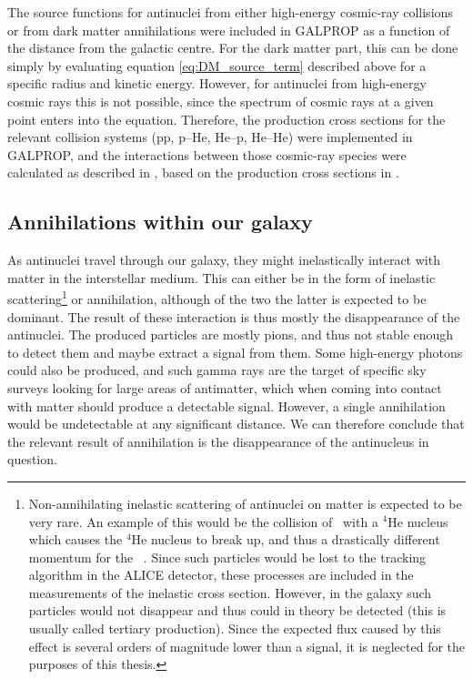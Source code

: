 The source functions for antinuclei from either high-energy cosmic-ray collisions or from dark matter annihilations were included in GALPROP as a function of the distance from the galactic centre. For the dark matter part, this can be done simply by evaluating equation \ref{eq:DM_source_term} described above for a specific radius and kinetic energy. However, for antinuclei from high-energy cosmic rays this is not possible, since the spectrum of cosmic rays at a given point enters into the equation. Therefore, the production cross sections for the relevant collision systems (pp, p--He, He--p, He--He) were implemented in GALPROP, and the interactions between those cosmic-ray species were calculated as described in \cite{ALICE-PUBLIC-2022-001}, based on the production cross sections in \cite{Shukla_2020}. 

\subsection{Annihilations within our galaxy}\label{sec:ResAnnInOurGalaxy}
As antinuclei travel through our galaxy, they might inelastically interact with matter in the interstellar medium. This can either be in the form of inelastic scattering\footnote{Non-annihilating inelastic scattering of antinuclei on matter is expected to be very rare. An example of this would be the collision of \ahe\ with a $^4\mathrm{He}$ nucleus which causes the $^4\mathrm{He}$ nucleus to break up, and thus a drastically different momentum for the \ahe\ . Since such particles would be lost to the tracking algorithm in the ALICE detector, these processes are included in the measurements of the inelastic cross section. However, in the galaxy such particles would not disappear and thus could in theory be detected (this is usually called tertiary production). Since the expected flux caused by this effect is several orders of magnitude lower than a signal, it is neglected for the purposes of this thesis.} or annihilation, although of the two the latter is expected to be dominant. The result of these interaction is thus mostly the disappearance of the antinuclei. The produced particles are mostly pions, and thus not stable enough to detect them and maybe extract a signal from them. Some high-energy photons could also be produced, and such gamma rays are the target of specific sky surveys looking for large areas of antimatter, which when coming into contact with matter should produce a detectable signal. However, a single annihilation would be undetectable at any significant distance. We can therefore conclude that the relevant result of annihilation is the disappearance of the antinucleus in question. \\

